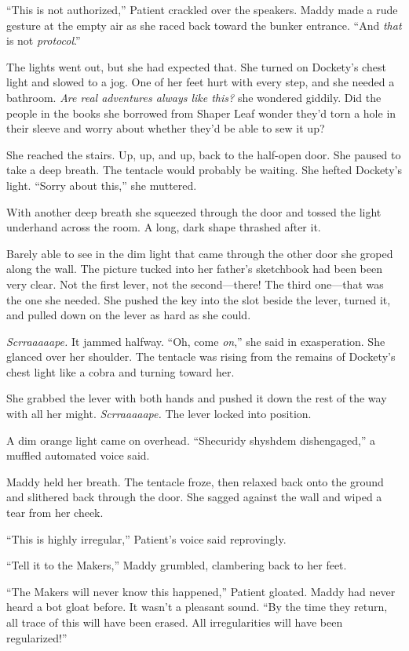 \documentclass[10pt]{article}
\begin{document}
``This is not authorized,'' Patient crackled over the speakers. Maddy
made a rude gesture at the empty air as she raced back toward the bunker
entrance. ``And \emph{that} is not \emph{protocol}.''

The lights went out, but she had expected that. She turned on Dockety's
chest light and slowed to a jog. One of her feet hurt with every step,
and she needed a bathroom. \emph{Are real adventures always like this?}
she wondered giddily. Did the people in the books she borrowed from
Shaper Leaf wonder they'd torn a hole in their sleeve and worry about
whether they'd be able to sew it up?

She reached the stairs. Up, up, and up, back to the half-open door. She
paused to take a deep breath. The tentacle would probably be waiting.
She hefted Dockety's light. ``Sorry about this,'' she muttered.

With another deep breath she squeezed through the door and tossed the
light underhand across the room. A long, dark shape thrashed after it.

Barely able to see in the dim light that came through the other door she
groped along the wall. The picture tucked into her father's sketchbook
had been been very clear. Not the first lever, not the second---there!
The third one---that was the one she needed. She pushed the key into the
slot beside the lever, turned it, and pulled down on the lever as hard
as she could.

\emph{Scrraaaaape.} It jammed halfway. ``Oh, come \emph{on},'' she said
in exasperation. She glanced over her shoulder. The tentacle was rising
from the remains of Dockety's chest light like a cobra and turning
toward her.

She grabbed the lever with both hands and pushed it down the rest of the
way with all her might. \emph{Scrraaaaape.} The lever locked into
position.

A dim orange light came on overhead. ``Shecuridy shyshdem dishengaged,''
a muffled automated voice said.

Maddy held her breath. The tentacle froze, then relaxed back onto the
ground and slithered back through the door. She sagged against the wall
and wiped a tear from her cheek.

``This is highly irregular,'' Patient's voice said reprovingly.

``Tell it to the Makers,'' Maddy grumbled, clambering back to her feet.

``The Makers will never know this happened,'' Patient gloated. Maddy had
never heard a bot gloat before. It wasn't a pleasant sound. ``By the
time they return, all trace of this will have been erased. All
irregularities will have been regularized!''
\end{document}
